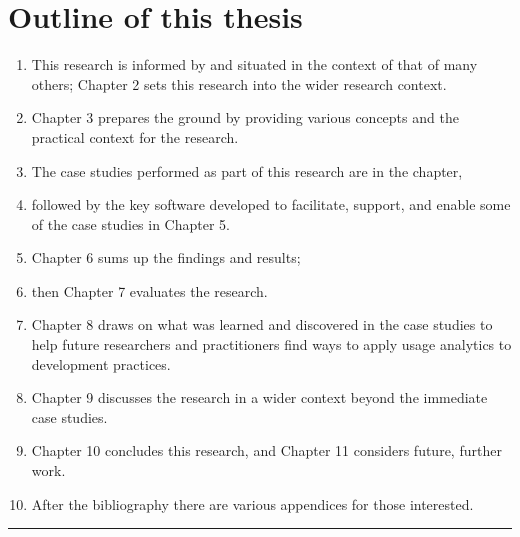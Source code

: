 \section{Outline of this thesis}
\begin{enumerate}
    \itemsep0em
    \item This research is informed by and situated in the context of that of many others; Chapter 2 sets this research into the wider research context.
    \item Chapter 3 prepares the ground by providing various concepts and the practical context for the research.
    \item The case studies performed as part of this research are in the  chapter,
    \item followed by the key software developed to facilitate, support, and enable some of the case studies in Chapter 5.
    \item Chapter 6 sums up the findings and results;
    \item then Chapter 7 evaluates the research.
    \item Chapter 8 draws on what was learned and discovered in the case studies to help future researchers and practitioners find ways to apply usage analytics to development practices.
    \item Chapter 9 discusses the research in a wider context beyond the immediate case studies.
    \item Chapter 10 concludes this research, and Chapter 11 considers future, further work.
    \item After the bibliography there are various appendices for those interested.
\end{enumerate}



\par\noindent\rule{\textwidth}{0.4pt}
